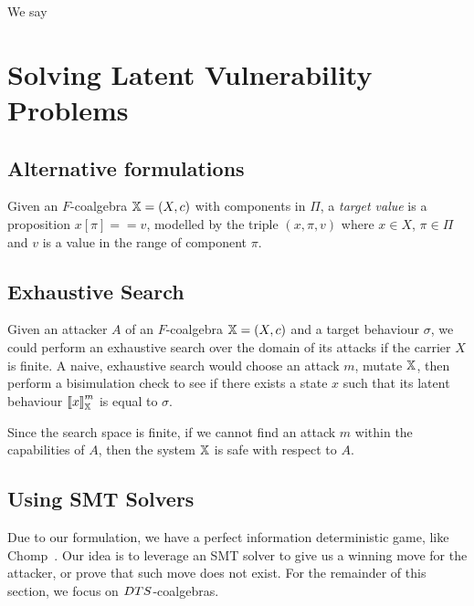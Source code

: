 \begin{definition}
We say 
\end{definition}
 
 \section{Solving Latent Vulnerability Problems}
 
 \subsection{Alternative formulations}
 \begin{definition}
Given an $F$-coalgebra ${\mathbb{X}}=(X,c)$ with components in $\Pi$, a \emph{target value} is a proposition $x[\pi]==v$, modelled by the triple $(x,\pi,v)$ where $x\in X$, $\pi\in \Pi$ and $v$ is a value in the range of component $\pi$.
\end{definition}
 
 \subsection{Exhaustive Search}
Given an attacker $A$ of an $F$-coalgebra ${\mathbb{X}}=(X,c)$ and a target behaviour $\sigma$, we could perform an exhaustive search over the domain of its attacks if the carrier $X$ is finite.  A naive, exhaustive search would choose an attack $m$, mutate ${\mathbb{X}}$, then perform a bisimulation check to see if there exists a state $x$ such that its latent behaviour ${{\llbracket x\rrbracket}}^{m}_{{\mathbb{X}}}$ is equal to $\sigma$.

Since the search space is finite, if we cannot find an attack $m$ within the capabilities of $A$, then the system ${\mathbb{X}}$ is safe with respect to $A$.

\begin{example}
\end{example}


\subsection{Using SMT Solvers}
Due to our formulation, we have a perfect information deterministic game, like Chomp~\cite{Chomp}. Our idea is to leverage an SMT solver to give us a winning move for the attacker, or prove that such move does not exist. For the remainder of this section, we focus on $DTS$-coalgebras.

